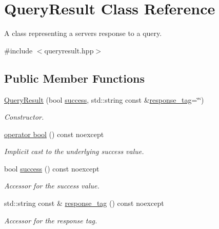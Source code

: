 \hypertarget{class_query_result}{}\section{Query\+Result Class Reference}
\label{class_query_result}


A class representing a server\textquotesingle{}s response to a query.  




{\ttfamily \#include $<$queryresult.\+hpp$>$}

\subsection*{Public Member Functions}
\begin{DoxyCompactItemize}
\item 
\hyperlink{class_query_result_a2bcdccec574314df85c4bff6611c215b}{Query\+Result} (bool \hyperlink{class_query_result_ae1b66d19c66ed5c97dd3322c3c721c82}{success}, std\+::string const \&\hyperlink{class_query_result_a3d238ce0ccc659d2918dac0479937d3c}{response\+\_\+tag}=\char`\"{}\char`\"{})
\begin{DoxyCompactList}\small\item\em Constructor. \end{DoxyCompactList}\item 
\mbox{\label{class_query_result_a280533eecc3453bb2e65119070cc9fc7}} 
\hyperlink{class_query_result_a280533eecc3453bb2e65119070cc9fc7}{operator bool} () const noexcept
\begin{DoxyCompactList}\small\item\em Implicit cast to the underlying success value. \end{DoxyCompactList}\item 
bool \hyperlink{class_query_result_ae1b66d19c66ed5c97dd3322c3c721c82}{success} () const noexcept
\begin{DoxyCompactList}\small\item\em Accessor for the success value. \end{DoxyCompactList}\item 
std\+::string const  \& \hyperlink{class_query_result_a3d238ce0ccc659d2918dac0479937d3c}{response\+\_\+tag} () const noexcept
\begin{DoxyCompactList}\small\item\em Accessor for the response tag. \end{DoxyCompactList}\end{DoxyCompactItemize}


